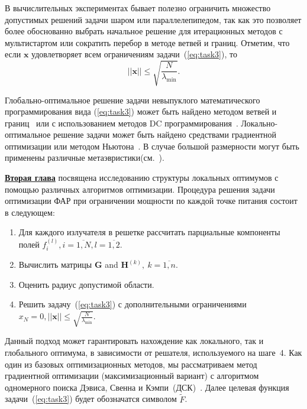 В вычислительных экспериментах бывает полезно ограничить множество допустимых решений задачи шаром или параллелепипедом, так как это позволяет более обоснованно выбрать начальное решение для итерационных методов с мультистартом или сократить перебор в методе ветвей и границ. Отметим, что если $\textbf{x}$ удовлетворяет всем ограничениям задачи~(\ref{eq:task3}), то
\begin{equation} \label{eqn:bound}
||\textbf{x}||\le \sqrt{\frac{N}{\lambda_{\min}}}.
\end{equation}

Глобально-оптимальное решение задачи невыпуклого математического программирования вида (\ref{eq:task3}) может быть найдено методом
ветвей и границ~\autocite{horst:global,tawarmalani:global} или с использованием методов DC программирования~\autocite{horst:handbook,strekalovsky:global}. Локально-оптимальное решение задачи может быть найдено средствами градиентной оптимизации или методом Ньютона~\cite{himmelblau:nlp}. В случае большой размерности могут быть применены различные метаэвристики(см.~\autocite{eberhart:swarm,storn:de}).

\underline{\textbf{Вторая глава}} посвящена исследованию структуры локальных оптимумов с помощью различных алгоритмов оптимизации.
Процедура решения задачи оптимизации ФАР при ограничении мощности по каждой точке питания состоит в следующем:
%
\begin{enumerate}
  \item Для каждого излучателя в решетке рассчитать парциальные компоненты полей $f_i^{(l)}, i= \overline{1,N}, l=\overline{1,2}$.
  \item Вычислить матрицы $\textbf{G}$ and ${\textbf{H}}^{(k)},\ k=\overline{1,n}$.
  \item Оценить радиус допустимой области.
  \item Решить задачу~(\ref{eq:task3}) с дополнительными ограничениями $x_N = 0, ||\textbf{x}||\le \sqrt{\frac{N}{\lambda_{\min}}}$.
\end{enumerate}

Данный подход может гарантировать нахождение как локального, так и глобального оптимума, в зависимости от решателя, используемого на шаге~4. Как один из базовых оптимизационных методов, мы рассматриваем метод градиентной оптимизации (максимизационный вариант)
с алгоритмом одномерного поиска Дэвиса, Свенна и Кэмпи~(ДСК)~\autocite{himmelblau:nlp}. Далее целевая функция задачи~(\ref{eq:task3}) будет обозначатся символом $\tilde{F}$.

